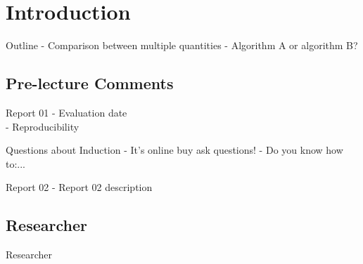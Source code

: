 \section{Introduction}

\begin{frame}{Outline}
  - Comparison between multiple quantities
  - Algorithm A or algorithm B?
\end{frame}

\subsection{Pre-lecture Comments}
\begin{frame}{Report 01}
  - Evaluation date\\
  - Reproducibility\\
\end{frame}

\begin{frame}{Questions about Induction}
  - It's online buy ask questions!
  - Do you know how to:...
\end{frame}

\begin{frame}{Report 02}
  - Report 02 description
\end{frame}

\subsection{Researcher}
\begin{frame}{Researcher}
\end{frame}
